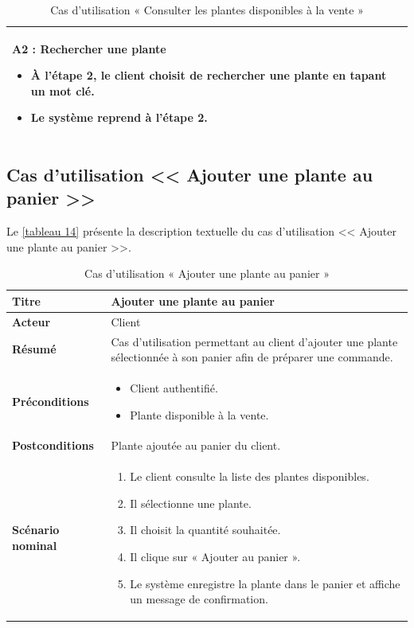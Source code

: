 \begin{table}[H]
\begin{tabular}{|p{4cm}|p{10cm}|}
\textbf{A2 : Rechercher une plante}
\begin{itemize}
    \item À l'étape 2, le client choisit de rechercher une plante en tapant un mot clé.
    \item Le système reprend à l'étape 2.
\end{itemize} \\
\hline
\end{tabular}
\caption{Cas d'utilisation « Consulter les plantes disponibles à la vente »}
\label{tableau 13}
\end{table}

\subsection{Cas d'utilisation << Ajouter une plante au panier >>}
Le \autoref{tableau 14} présente la description textuelle du cas d'utilisation << Ajouter une plante au panier >>.

\begin{table}[H]
\centering
\renewcommand{\arraystretch}{1.4}
\begin{tabular}{|p{4cm}|p{10cm}|}
\hline
\textbf{Titre} & Ajouter une plante au panier \\
\hline
\textbf{Acteur} & Client \\
\hline
\textbf{Résumé} & Cas d'utilisation permettant au client d'ajouter une plante sélectionnée à son panier afin de préparer une commande. \\
\hline
\textbf{Préconditions} &
\vspace{-12pt}
\begin{itemize}
    \item Client authentifié.
    \item Plante disponible à la vente.
\end{itemize} \\
\hline
\textbf{Postconditions} & Plante ajoutée au panier du client. \\
\hline
\textbf{Scénario nominal} &
\vspace{-12pt}
\begin{enumerate}
    \item Le client consulte la liste des plantes disponibles.
    \item Il sélectionne une plante.
    \item Il choisit la quantité souhaitée.
    \item Il clique sur « Ajouter au panier ».
    \item Le système enregistre la plante dans le panier et affiche un message de confirmation.
\end{enumerate} \\
\hline
\end{tabular}
\caption{Cas d'utilisation « Ajouter une plante au panier »}
\label{tableau 14}
\end{table}


